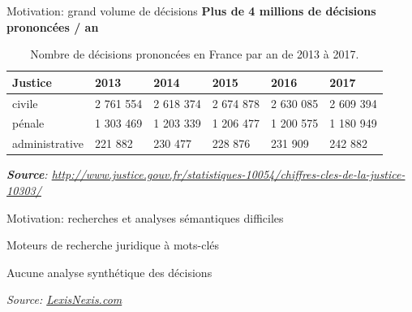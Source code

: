 \documentclass[newPxFont,pagenumber]{beamer}
\begin{document}
\begin{frame}[c]{Motivation: grand volume de décisions}
	\textbf{Plus de 4 millions de décisions prononcées / an}
	\begin{table}[!htb]
		\scriptsize
		\begin{center}
			\begin{tabular}{|l|l|l|l|l|l|}
				\hline
				\textbf{Justice}	& \textbf{2013}  & \textbf{2014}  & \textbf{2015}  & \textbf{2016}  & \textbf{2017}  \\ \hline
				civile   & 2 761 554 & 2 618 374 & 2 674 878 & 2 630 085 & 2 609 394 \\ \hline
				pénale   & 1 303 469 & 1 203 339 & 1 206 477 & 1 200 575 & 1 180 949 \\ \hline
				administrative & 221 882 & 230 477 & 228 876 & 231 909 & 242 882 \\ \hline
			\end{tabular}
			
			\textit{\scriptsize{\textbf{Source}: \url{http://www.justice.gouv.fr/statistiques-10054/chiffres-cles-de-la-justice-10303/}}}  
		\end{center}
		\caption{Nombre de décisions prononcées en France par an de 2013 à 2017.}\label{tab:intro:nbdecisionstats}
	\end{table}
\end{frame}

\begin{frame}[t]{Motivation: recherches et analyses sémantiques difficiles}
	
	Moteurs de recherche juridique à mots-clés 
	
	Aucune analyse synthétique des décisions 
	
	
	\textit{\tiny{Source: \url{LexisNexis.com}}} 
\end{frame}
\end{document}
